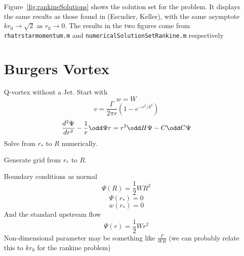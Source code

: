 \documentclass{X:/Documents/Coding/Latex/myreport}
\begin{document}
Figure~\ref{fig:rankineSolutions} shows the solution set for the problem. It displays the same results as those found in (Escudier, Keller), with the same asymptote $kr_0 \to \sqrt{2}$ as $r_0 \to 0$. The results in the two figures come from \verb|rhatrstarmomentum.m| and \verb|numericalSolutionSetRankine.m| respectively
%

%


\clearpage
\section{Burgers Vortex}
Q-vortex without a Jet.
Start with 
\[w = W\]
\[v = \frac{\Gamma}{2\pi r} \left(1 - e^{-r^2/\delta^2}\right)\]
\[\frac{d^2\Psi}{dr^2} - \frac1r \odd \Psi r = r^2 \odd H\Psi - C \odd C\Psi \]
Solve from $r_*$ to $R$ numerically.

Generate grid from $r_*$ to $R$.

Boundary conditions as normal
\[\Psi(R) = \frac12 WR^2\]
\[\Psi(r_*) = 0\]
\[w(r_*) = 0\]
And the standard upstream flow 
\[\Psi(r)  =\frac12 Wr^2\]
Non-dimensional parameter may be something like $\frac{\Gamma}{WR}$ (we can probably relate this to $kr_0$ for the rankine problem)
\end{document}

